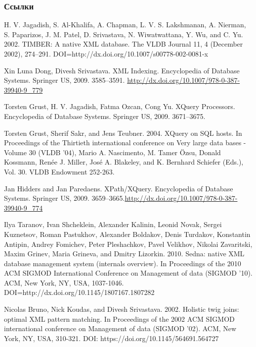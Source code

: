 \documentclass{beamer}
\begin{document}
\begin{frame}[allowframebreaks]
\frametitle{Ссылки}
\footnotesize{
\begin{thebibliography}{99}

 H. V. Jagadish, S. Al-Khalifa, A. Chapman, L. V. S. Lakshmanan, A. Nierman, S. Paparizos, J. M. Patel, D. Srivastava, N. Wiwatwattana, Y. Wu, and C. Yu. 2002. TIMBER: A native XML database. The VLDB Journal 11, 4 (December 2002), 274--291. DOI=http://dx.doi.org/10.1007/s00778-002-0081-x 

 Xin Luna Dong, Divesh Srivastava. XML Indexing. Encyclopedia of Database Systems. Springer US, 2009. 3585--3591. \url{http://dx.doi.org/10.1007/978-0-387-39940-9_779}

 Torsten Grust, H. V. Jagadish, Fatma Ozcan, Cong Yu. XQuery Processors. Encyclopedia of Database Systems. Springer US, 2009. 3671--3675.

 Torsten Grust, Sherif Sakr, and Jens Teubner. 2004. XQuery on SQL hosts. In Proceedings of the Thirtieth international conference on Very large data bases - Volume 30 (VLDB '04), Mario A. Nascimento, M. Tamer Özsu, Donald Kossmann, Renée J. Miller, José A. Blakeley, and K. Bernhard Schiefer (Eds.), Vol. 30. VLDB Endowment 252-263. 

 Jan Hidders and Jan Paredaens. XPath/XQuery. Encyclopedia of Database Systems. Springer US, 2009. 3659--3665.\url{http://dx.doi.org/10.1007/978-0-387-39940-9_774}

 Ilya Taranov, Ivan Shcheklein, Alexander Kalinin, Leonid Novak, Sergei Kuznetsov, Roman Pastukhov, Alexander Boldakov, Denis Turdakov, Konstantin Antipin, Andrey Fomichev, Peter Pleshachkov, Pavel Velikhov, Nikolai Zavaritski, Maxim Grinev, Maria Grineva, and Dmitry Lizorkin. 2010. Sedna: native XML database management system (internals overview). In Proceedings of the 2010 ACM SIGMOD International Conference on Management of data (SIGMOD '10). ACM, New York, NY, USA, 1037-1046. DOI=http://dx.doi.org/10.1145/1807167.1807282 

 Nicolas Bruno, Nick Koudas, and Divesh Srivastava. 2002. Holistic twig joins: optimal XML pattern matching. In Proceedings of the 2002 ACM SIGMOD international conference on Management of data (SIGMOD '02). ACM, New York, NY, USA, 310-321. DOI: https://doi.org/10.1145/564691.564727 


\end{thebibliography}}
\end{frame}
\end{document}
